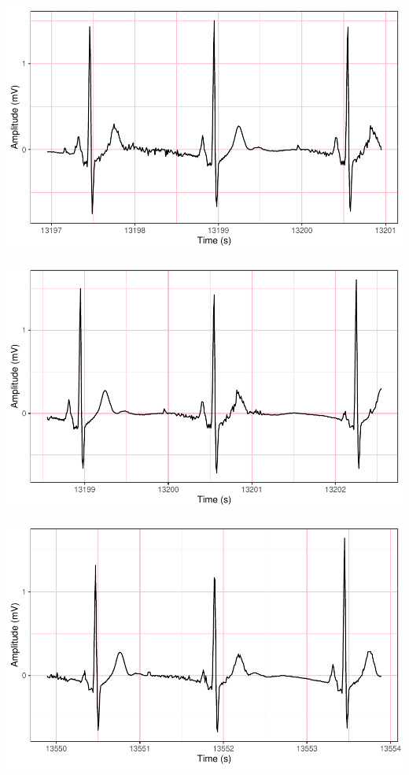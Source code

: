\documentclass[
]{article}
\begin{document}
\begin{center}\includegraphics{report_files/figure-latex/abnormal-interval-18} \end{center}

\begin{center}\includegraphics{report_files/figure-latex/abnormal-interval-19} \end{center}

\begin{center}\includegraphics{report_files/figure-latex/abnormal-interval-20} \end{center}
\end{document}
